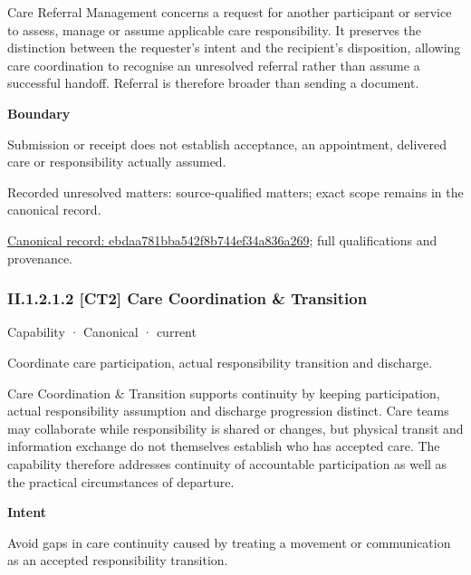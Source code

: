 Care Referral Management concerns a request for another participant or service to assess, manage or assume applicable care responsibility. It preserves the distinction between the requester's intent and the recipient's disposition, allowing care coordination to recognise an unresolved referral rather than assume a successful handoff. Referral is therefore broader than sending a document.



\textbf{Boundary}



Submission or receipt does not establish acceptance, an appointment, delivered care or responsibility actually assumed.


{\small Recorded unresolved matters: source-qualified matters; exact scope remains in the canonical record.}\par
{\footnotesize \href{../../../../../../../continuum/strategy/capability/ebdaa781bba542f8b744ef34a836a269.md}{Canonical record: ebdaa781bba542f8b744ef34a836a269}; full qualifications and provenance.}\par
\subsubsection*{II.1.2.1.2 [CT2] Care Coordination \& Transition}
\label{navigation:II.1.2.1.2}

\label{element:174a9b93d19c44828f20360e9d543925}
{\small Capability · Canonical · current}\par

Coordinate care participation, actual responsibility transition and discharge.



Care Coordination \& Transition supports continuity by keeping participation, actual responsibility assumption and discharge progression distinct. Care teams may collaborate while responsibility is shared or changes, but physical transit and information exchange do not themselves establish who has accepted care. The capability therefore addresses continuity of accountable participation as well as the practical circumstances of departure.



\textbf{Intent}



Avoid gaps in care continuity caused by treating a movement or communication as an accepted responsibility transition.



